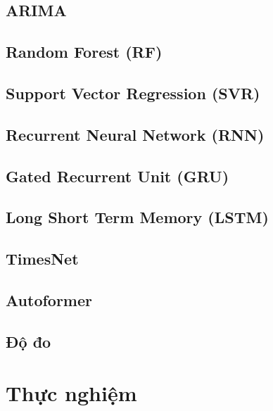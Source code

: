 \documentclass[conference]{IEEEtran}
\begin{document}
\subsection{ARIMA}


\subsection{Random Forest (RF)}


\subsection{Support Vector Regression (SVR)}


\subsection{Recurrent Neural Network (RNN)}


\subsection{Gated Recurrent Unit (GRU)}


\subsection{Long Short Term Memory (LSTM)}


\subsection{TimesNet}


\subsection{Autoformer}


\subsection{Độ đo}


\section{Thực nghiệm}

\end{document}
